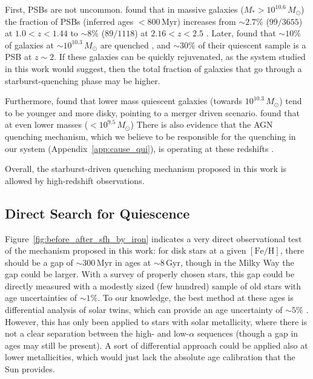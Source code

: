 \documentclass[twocolumn,linenumbers,trackchanges]{aastex631}
\newcommand{\Msun}{\ensuremath{M_{\odot}}}
\newcommand{\Gyr}{\ensuremath{\textrm{Gyr}}}
\newcommand{\Myr}{\ensuremath{\textrm{Myr}}}
\newcommand{\FeH}{\ensuremath{[\textrm{Fe}/\textrm{H}]}}
\begin{document}
First, PSBs are not uncommon. \citet{2023ApJ...953..119P} found that in massive galaxies ($M_* > 10^{10.6}\,\Msun$) the fraction of PSBs (inferred ages $< 800\,\Myr$) increases from $\sim2.7\%$ ($99/3655$) at $1.0 < z < 1.44$ to $\sim8\%$ ($89/1118$) at $2.16 < z < 2.5$ \citep[see also][]{2012ApJ...745..179W,2019ApJ...874...17B}. Later, \citet{2024arXiv240417945P} found that $\sim10\%$ of galaxies at $\sim10^{10.3}\,\Msun$ are quenched \citep[consistent with][]{2013ApJ...777...18M}, and $\sim30\%$ of their quiescent sample is a PSB at $z\sim2$. If these galaxies can be quickly rejuvenated, as the system studied in this work would suggest, then the total fraction of galaxies that go through a starburst-quenching phase may be higher.

Furthermore, \citet{2023arXiv231215012C} found that lower mass quiescent galaxies (towards $10^{10.3}\,\Msun$) tend to be younger and more disky, pointing to a merger driven scenario. \citet{2023arXiv231212207A} found that at even lower masses ($<10^{9.5}\,\Msun$) There is also evidence that the AGN quenching mechanism, which we believe to be responsible for the quenching in our system (Appendix~\ref{app:cause_qui}), is operating at these redshifts \citep[e.g.][and references therein]{2023arXiv230806317D,2024arXiv240417945P,2024arXiv240518685M,2024Natur.630...54B}.

Overall, the starburst-driven quenching mechanism proposed in this work is allowed by high-redshift observations.

\subsection{Direct Search for Quiescence}\label{ssec:obsqui}
Figure~\ref{fig:before_after_sfh_by_iron} indicates a very direct observational test of the mechanism proposed in this work: for disk stars at a given \FeH{}, there should be a gap of $\sim300\,\Myr$ in ages at $\sim8\,\Gyr$, though in the Milky Way the gap could be larger. With a survey of properly chosen stars, this gap could be directly measured with a modestly sized (few hundred) sample of old stars with age uncertainties of $\sim1\%$. To our knowledge, the best method at these ages is differential analysis of solar twins, which can provide an age uncertainty of $\sim5\%$ \citep[e.g.][]{2014ApJ...795...23B,2018MNRAS.474.2580S}. However, this has only been applied to stars with solar metallicity, where there is not a clear separation between the high- and low-$\alpha$ sequences (though a gap in ages may still be present). A sort of differential approach could be applied also at lower metallicities, which would just lack the absolute age calibration that the Sun provides.
\end{document}
